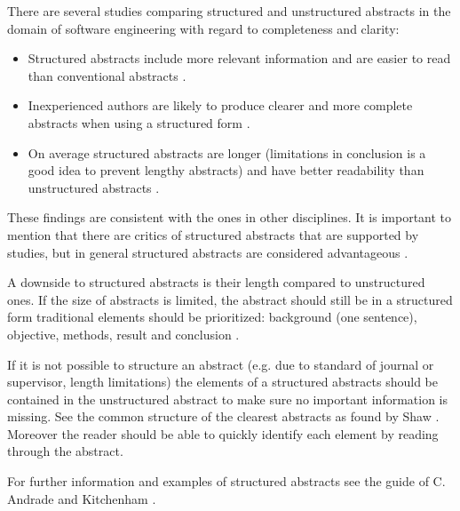 
There are several studies comparing structured and unstructured abstracts in the domain of software engineering with regard to completeness and clarity:
\begin{itemize}
\item Structured abstracts include more relevant information and are easier to read than conventional abstracts \cite{Budgen2007,Budgen2008}.
\item Inexperienced authors are likely to produce clearer and more complete abstracts when using a structured form \cite{Budgen2011} .
\item On average structured abstracts are longer (limitations in conclusion is a good idea to prevent lengthy abstracts) and have better readability than unstructured abstracts \cite{KBO2008}.
\end{itemize}
	
These findings are consistent with the ones in other disciplines. It is important to mention that there are critics of structured abstracts that are supported by studies, but in general structured abstracts are considered advantageous \cite{hartley2004,hartley2014}.	

A downside to structured abstracts is their length compared to unstructured ones. If the size of abstracts is limited, the abstract should still be in a structured form traditional elements should be prioritized: background (one sentence), objective, methods, result and conclusion \cite{Jedlitschka2008}.

If it is not possible to structure an abstract (e.g. due to standard of journal or supervisor, length limitations) the elements of a structured abstracts should be contained in the unstructured abstract to make sure no important information is missing. See the common structure of the clearest abstracts as found by Shaw \cite{shaw2003}. Moreover the reader should be able to quickly identify each element by reading through the abstract.

For further information  and examples of structured abstracts see the guide of C. Andrade \cite{Andrade2011} and Kitchenham \etal \cite{EBSE}.
